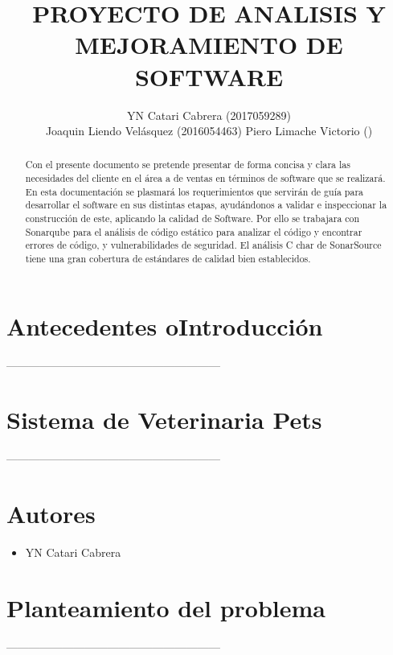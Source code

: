 \documentclass[preprint,12pt]{elsarticle}
\begin{document}
	
	\begin{frontmatter}

		\title{\huge  PROYECTO DE  ANALISIS Y  MEJORAMIENTO DE  SOFTWARE }
		\author{YN Catari Cabrera              (2017059289)\\
		Joaquin Liendo Velásquez (2016054463)
		Piero Limache Victorio ()
	}
		
		\address{Tacna, Perú}
		


\begin{abstract}
Con el presente documento se pretende presentar de forma concisa y clara las necesidades del cliente en el área a de ventas en términos de software que se realizará. 
En esta documentación se plasmará los requerimientos que servirán de guía para desarrollar el software en sus distintas etapas, ayudándonos a validar e inspeccionar la construcción de este, aplicando la calidad de Software.
Por ello se trabajara con  Sonarqube para el análisis de código estático
para analizar el código y encontrar errores de código, y vulnerabilidades de seguridad. 
El análisis C char de SonarSource tiene una gran cobertura de estándares de calidad bien establecidos.  
\end{abstract}


\end{frontmatter}
\section{Antecedentes oIntroducción}

---------------------------------------------------------

\section{Sistema de  Veterinaria Pets}
---------------------------------------------------------
\section{Autores}
\begin{itemize}
    \item YN Catari Cabrera
    
    
\end{itemize}
\section{Planteamiento del problema}
---------------------------------------------------------
\end{document}
